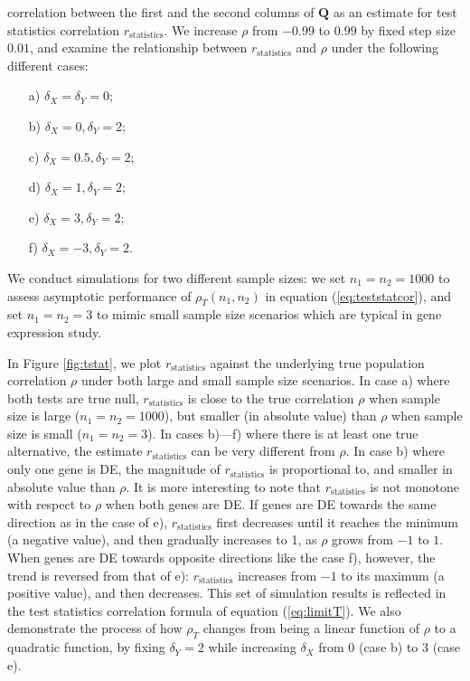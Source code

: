 correlation between the first and the second columns of $\bm Q$ as an estimate for test 
statistics correlation	$r_\text{statistics}$. 
We increase $\rho$ from $-0.99$ to $0.99$ by fixed step size $0.01$, and examine the 
relationship between $r_\text{statistics}$ and $\rho$ under the following different cases:
\begin{enumerate}
	\item[a)]  $\delta_X = \delta_Y  =0$;
	\item[b)]  $\delta_X = 0, \delta_Y=2$;
	\item[c)]  $\delta_X = 0.5, \delta_Y=2$;
	\item[d)]  $\delta_X = 1, \delta_Y=2$;
	\item[e)]  $\delta_X = 3, \delta_Y=2$;
	\item[f)]  $\delta_X = -3, \delta_Y=2$.
\end{enumerate}

We conduct simulations for two different sample sizes: we set $n_1 = n_2 = 1000$ to assess 
asymptotic performance of $\rho_T(n_1,n_2)$ in equation (\ref{eq:teststatcor}), and set $n_1 = n_2 
= 3$ to mimic small sample size scenarios which are typical in gene expression study. 

In Figure \ref{fig:tstat}, we plot $r_\text{statistics}$ against the 
underlying true population correlation $\rho$ under both large and small sample size scenarios. 
In case a) where both tests are true null, $r_\text{statistics}$ is close to the true 
correlation $\rho$ when sample size is large ($n_1 = n_2 = 1000$), but smaller (in absolute 
value) than $\rho$ when sample size is small ($n_1 = n_2 = 3$).
In cases b)---f) where there is at least one true alternative, the estimate
$r_\text{statistics}$ can be very 
different from $\rho$. In case b) where only one gene is DE, 
the magnitude of $r_\text{statistics}$ is proportional to, and smaller in absolute value than 
$\rho$.
It is more interesting to note that $r_\text{statistics}$ is not monotone with respect to 
$\rho$ when both genes are DE. If genes are DE towards the same direction as in the case of 
e),  $r_\text{statistics}$ first decreases until it reaches the minimum (a negative value), and 
then gradually increases to 1, as 
$\rho$ grows from $-1$ to $1$. When genes are DE towards opposite directions like the case f), 
however, the trend is reversed from that of e): $r_\text{statistics}$ increases from $-1$ to 
its maximum (a positive value), and then decreases. 
This set of simulation results is reflected in the test statistics correlation formula of 
equation (\ref{eq:limitT}). We also demonstrate the process of how $\rho_T$ changes from
being a linear function of $\rho$ to a quadratic function, by fixing $\delta_Y=2$ while 
increasing $\delta_X$ from $0$ (case b) to $3$ (case e).


